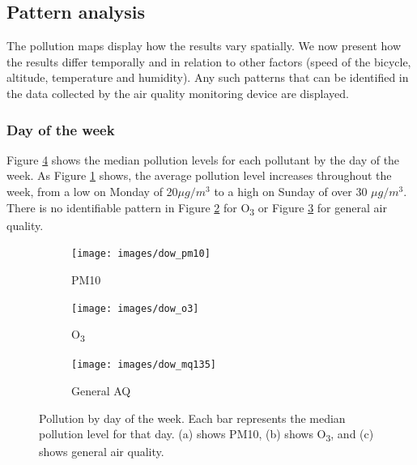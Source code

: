 \documentclass[11pt]{report}
\begin{document}
\subsection{Pattern analysis}

The pollution maps display how the results vary spatially. We now present how the results differ temporally and in relation to other factors (speed of the bicycle, altitude, temperature and humidity). Any such patterns that can be identified in the data collected by the air quality monitoring device are displayed.

\subsubsection{Day of the week}

Figure \ref{fig:dow_bars} shows the median pollution levels for each pollutant by the day of the week. As Figure \ref{fig:dow_pm10} shows, the average pollution level increases throughout the week, from a low on Monday of 20$\mu g/m^3$ to a high on Sunday of over 30 $\mu g/m^3$. There is no identifiable pattern in Figure \ref{fig:dow_o3} for O\textsubscript{3} or Figure \ref{fig:dow_mq135} for general air quality.

\begin{figure}[!htbp]
    \centering
    \begin{minipage}{1\linewidth}
            \begin{subfigure}[t]{.45\linewidth}
                \texttt{[image: images/dow\_pm10]}
                \caption{PM10}
                \label{fig:dow_pm10}
            \end{subfigure}
            \begin{subfigure}[t]{.45\linewidth}
            	\texttt{[image: images/dow\_o3]}
            	\caption{O\textsubscript{3}}
            	\label{fig:dow_o3}
	   \end{subfigure}
        \end{minipage}
    \begin{minipage}{1\linewidth}
    	\centering
            \begin{subfigure}[t]{.45\linewidth}
                \texttt{[image: images/dow\_mq135]}
                \caption{General AQ}
                \label{fig:dow_mq135}
            \end{subfigure}
        \end{minipage}
    \caption[Pollution by day of the week.]{Pollution by day of the week. Each bar represents the median pollution level for that day. (a) shows PM10, (b) shows O\textsubscript{3}, and (c) shows general air quality.}
    \label{fig:dow_bars}
\end{figure}
\end{document}
